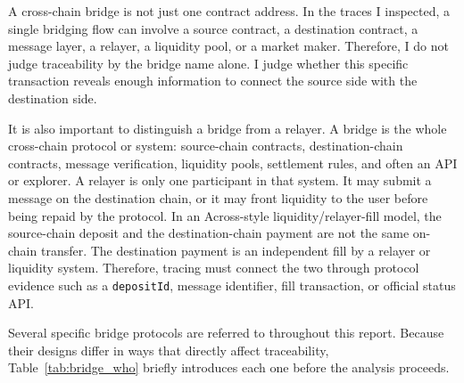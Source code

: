 \documentclass[12pt,a4paper]{article}
\begin{document}
A cross-chain bridge is not just one contract address. In the traces I inspected, a single bridging flow can involve a source contract, a destination contract, a message layer, a relayer, a liquidity pool, or a market maker. Therefore, I do not judge traceability by the bridge name alone. I judge whether this specific transaction reveals enough information to connect the source side with the destination side.

It is also important to distinguish a bridge from a relayer. A bridge is the whole cross-chain protocol or system: source-chain contracts, destination-chain contracts, message verification, liquidity pools, settlement rules, and often an API or explorer. A relayer is only one participant in that system. It may submit a message on the destination chain, or it may front liquidity to the user before being repaid by the protocol. In an Across-style liquidity/relayer-fill model, the source-chain deposit and the destination-chain payment are not the same on-chain transfer. The destination payment is an independent fill by a relayer or liquidity system. Therefore, tracing must connect the two through protocol evidence such as a \texttt{depositId}, message identifier, fill transaction, or official status API.

Several specific bridge protocols are referred to throughout this report. Because their designs differ in ways that directly affect traceability, Table~\ref{tab:bridge_who} briefly introduces each one before the analysis proceeds.
\end{document}
